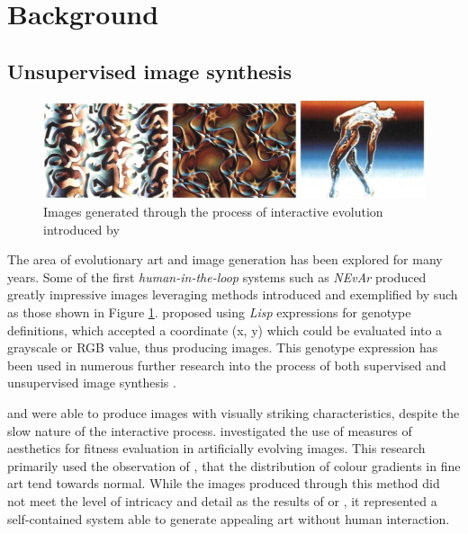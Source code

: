 \documentclass{article}
\begin{document}
\section{Background}

\subsection{Unsupervised image synthesis}

\begin{figure}[h!]
	\includegraphics[width=\textwidth]{images/sims-interactive-image-generation.png}
	\caption{Images generated through the process of interactive evolution introduced by \citet{sims}}
	\label{fig:sims}
\end{figure}

The area of evolutionary art and image generation has been explored for many years.
Some of the first \textit{human-in-the-loop} systems such as \textit{NEvAr} \citep{nevar} produced greatly impressive images leveraging methods introduced and exemplified by \citet{sims} such as those shown in Figure \ref{fig:sims}.
\citet{sims} proposed using \textit{Lisp} expressions for genotype definitions, which accepted a coordinate (x, y) which could be evaluated into a grayscale or RGB value, thus producing images.
This genotype expression has been used in numerous further research into the process of both supervised and unsupervised image synthesis \citep{nevar, sims, den2011evolving, distributed-evolutionary-art, aesthetic-measures}.

\citet{sims} and \citet{nevar} were able to produce images with visually striking characteristics, despite the slow nature of the interactive process.
\citet{aesthetic-measures} investigated the use of measures of aesthetics for fitness evaluation in artificially evolving images.
This research primarily used the observation of \citet{ralph-bell-curve}, that the distribution of colour gradients in fine art tend towards normal.
While the images produced through this method did not meet the level of intricacy and detail as the results of \citet{sims} or \citet{nevar}, it represented a self-contained system able to generate appealing art without human interaction.
\end{document}
